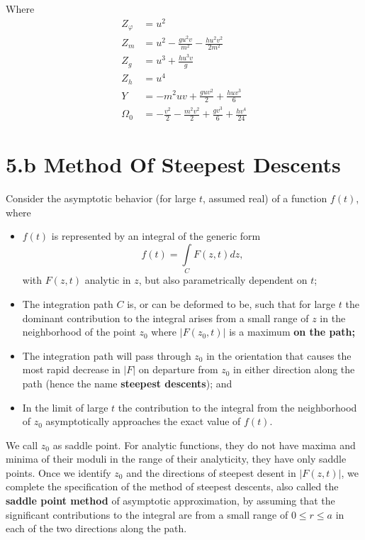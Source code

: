 \documentclass[11pt,a4paper,sans]{moderncv}        %
\begin{document}
Where 
\begin{equation*}
\begin{split}
	Z_{\varphi} & = {u^2}
	\\
	Z_{m} & = {u^2} - \frac{gu^2v}{m^2} - \frac{hu^2v^2}{2m^2}
	\\
	Z_{g} & = {u^3} + \frac{hu^3v}{g}
	\\
	Z_{h} & = {u^4}
	\\
	Y & = -{m^2uv} + \frac{guv^2}{2} + \frac{huv^3}{6}
	\\
	\Omega_{0} & = -\frac{v^2}{2} - \frac{m^2v^2}{2} + \frac{gv^3}{6} + \frac{hv^4}{24}
\end{split}
\end{equation*}
\clearpage
\section{5.b Method Of Steepest Descents\textcolor{black}{\footnotemark[1]}}
\enlargethispage{\footskip}
Consider the asymptotic behavior (for large $t$, assumed real) of a function $f(t)$, where
\vspace{0.2cm}
\begin{itemize}
	\item $f(t)$ is represented by an integral of the generic form
		\begin{equation*}
			f(t) = \int\limits_{C} F(z,t) dz,
		\end{equation*}
		with $F(z,t)$ analytic in $z$, but also parametrically dependent on $t$;
	\item The integration path $C$ is, or can be deformed to be, such that for large $t$ the dominant contribution to the integral arises from a small range of $z$ in the neighborhood of the point $z_{0}$ where $|F(z_{0},t)|$ is a maximum \textbf{on the path;}
	\item The integration path will pass through $z_{0}$ in the orientation that causes the most rapid decrease in $|F|$ on departure from $z_{0}$ in either direction along the path (hence the name \textbf{steepest descents}); and 
	\item In the limit of large $t$ the contribution to the integral from the neighborhood of $z_{0}$ asymptotically approaches the exact value of $f(t)$.
\end{itemize}
\vspace{0.2cm}
We call $z_{0}$ as saddle point. For analytic functions, they do not have maxima and minima of their moduli in the range of their analyticity, they have only saddle points.
Once we identify $z_{0}$ and the directions of steepest desent in $|F(z,t)|$, we complete the specification of the method of steepest descents, also called the \textbf{saddle point method} of asymptotic approximation, by assuming that the significant contributions to the integral are from a small range of $0 \le r \le a$ in each of the two directions along the path.
\end{document}
